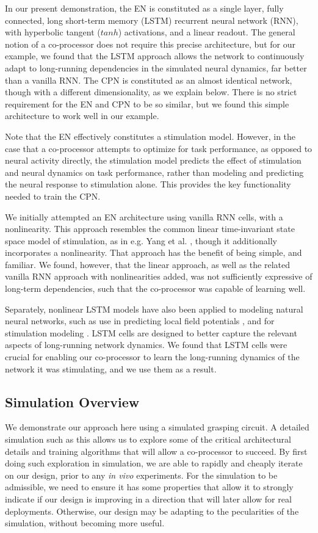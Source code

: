 \documentclass[12pt]{iopart}
\begin{document}
In our present demonstration, the EN is constituted as a single layer, fully connected,
long short-term memory (LSTM) recurrent neural network (RNN), with hyperbolic tangent ($tanh$)
activations, and a linear readout. The general notion of a co-processor does
not require this precise architecture, but for our example, we found that the LSTM
approach allows the network to continuously adapt to long-running dependencies in
the simulated neural dynamics, far better than a vanilla RNN. The CPN is constituted
as an almost identical network, though with a different dimensionality, as we explain
below. There is no strict requirement for the EN and CPN to be so similar, but we
found this simple architecture to work well in our example.

Note that the EN effectively constitutes a stimulation model. However, in the case that
a co-processor attempts to optimize for task performance, as opposed to neural
activity directly, the stimulation model predicts the effect of stimulation and neural
dynamics on task performance, rather than modeling and predicting the neural response
to stimulation alone. This provides the key functionality needed to train the CPN.

We initially attempted an EN architecture using vanilla RNN cells, with a nonlinearity.
This approach resembles the common linear time-invariant state space model of
stimulation, as in e.g. Yang et al. \cite{shanechi.stimmodel}, though it additionally
incorporates a nonlinearity. That approach has the benefit of being simple, and familiar.
We found, however, that the linear approach, as well as the related vanilla RNN
approach with nonlinearities added, was not sufficiently expressive of long-term
dependencies, such that the co-processor was capable of learning well.

Separately, nonlinear LSTM models have also been applied to modeling natural
neural networks, such as use in predicting local field potentials
\cite{kim.lstm}, and for stimulation modeling \cite{guclu.lstm}.
LSTM cells are designed to better capture the relevant aspects of
long-running network dynamics. We found that LSTM cells were crucial for
enabling our co-processor to learn the long-running dynamics of the network
it was stimulating, and we use them as a result.

\subsection{Simulation Overview}
We demonstrate our approach here using a simulated grasping circuit.
A detailed simulation such as this allows us to explore some of the critical
architectural details and training algorithms that will allow a co-processor
to succeed.  By first doing such exploration in simulation, we are able to
rapidly and cheaply iterate on our design, prior to any \textit{in vivo}
experiments. For the simulation to be admissible, we need to ensure it has some
properties that allow it to strongly indicate if our design is improving in
a direction that will later allow for real deployments. Otherwise, our
design may be adapting to the pecularities of the simulation, without
becoming more useful.
\end{document}
